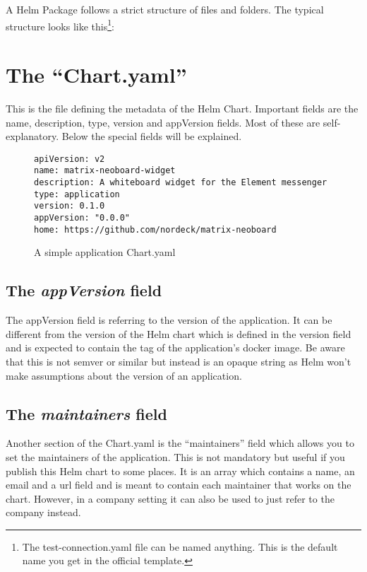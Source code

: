 A Helm Package follows a strict structure of files and folders.
The typical structure looks like this\footnote{The test-connection.yaml file can be named anything.
	This is the default name you get in the official template.}:

\section{The \enquote{Chart.yaml}}
This is the file defining the metadata of the Helm Chart.
Important fields are the name, description, type, version and appVersion fields.
Most of these are self-explanatory.
Below the special fields will be explained.

\begin{figure}[h]
\begin{verbatim}
apiVersion: v2
name: matrix-neoboard-widget
description: A whiteboard widget for the Element messenger
type: application
version: 0.1.0
appVersion: "0.0.0"
home: https://github.com/nordeck/matrix-neoboard
\end{verbatim}
\caption{A simple application Chart.yaml}\label{code:Chart.yaml}
\end{figure}

\subsection{The \emph{appVersion} field}
The appVersion field is referring to the version of the application.
It can be different from the version of the Helm chart which is defined in the version field and is expected to contain the tag of the application's docker image.
Be aware that this is not semver\cite{helmauthorsAppVersionsField} or similar but instead is an opaque string as Helm won't make assumptions about the version of an application.
\subsection{The \emph{maintainers} field}
Another section of the Chart.yaml is the \enquote{maintainers} field which allows you to set the maintainers of the application.
This is not mandatory but useful if you publish this Helm chart to some places.
It is an array which contains a name, an email and a url field and is meant to contain each maintainer that works on the chart.
However, in a company setting it can also be used to just refer to the company instead.

